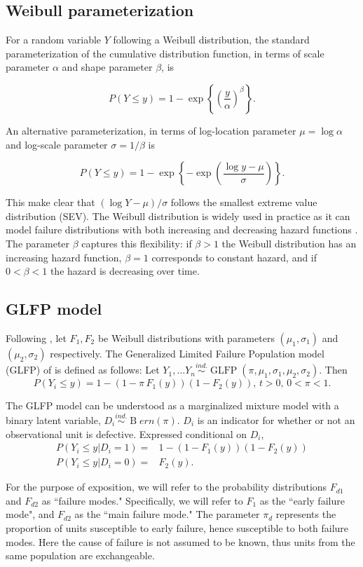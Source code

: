 \documentclass[12pt]{article}
\newcommand{\ind}{\stackrel{ind.}{\sim}}
\newcommand{\op}{\operatorname}
\begin{document}
\subsection{Weibull parameterization}
\label{sec:Weibull parameterization}
For a random variable $Y$ following a Weibull distribution, the standard parameterization of the cumulative distribution function, in terms of scale parameter $\alpha$ and shape parameter $\beta$, is

$$ P(Y \le y) = 1 - \exp \left\{ \left( \frac{y}{\alpha} \right)^\beta \right\}. $$

An alternative parameterization, in terms of log-location parameter $\mu = \log \alpha$ and log-scale parameter $\sigma = 1/\beta$ is

$$ P(Y \le y) = 1 - \exp \left\{ -\exp \left( \frac{ \log y - \mu }{\sigma} \right) \right\}. $$

This make clear that $(\log Y - \mu)/\sigma$ follows the smallest extreme value distribution (SEV). The Weibull distribution is widely used in practice as it can model failure distributions with both increasing and decreasing hazard functions \cite{meeker}. The parameter $\beta$ captures this flexibility: if $\beta>1$ the Weibull distribution has an increasing hazard function, $\beta=1$ corresponds to constant hazard, and if $0<\beta<1$ the hazard is decreasing over time.

\subsection{GLFP model}
\label{subsec:GLFP model}
Following \cite{chan}, let $F_1,F_2$ be Weibull distributions with parameters $(\mu_1,\sigma_1)$ and $(\mu_2, \sigma_2)$ respectively.
The Generalized Limited Failure Population model (GLFP) of \citet{chan} is defined as follows: Let $Y_1,\ldots Y_{n} \ind \op{GLFP}(\pi, \mu_1,\sigma_1,\mu_2,\sigma_2)$. Then
$$P(Y_i \le y) = 1 - (1-\pi\, F_{1}(y))(1 - F_{2}(y)),\, t>0,\, 0 < \pi < 1.$$

The GLFP model can be understood as a marginalized mixture model with a binary latent variable, $D_i\ind \op Bern(\pi)$. $D_i$ is an indicator for whether or not an observational unit is defective. Expressed conditional on $D_i$,
\begin{align*}
P(Y_i\le y | D_i=1) =& 1 -(1-F_1(y))(1-F_2(y))\\
P(Y_i\le y | D_i=0) =& F_2(y).
\end{align*}

For the purpose of exposition, we will refer to the probability distributions $F_{d1}$ and $F_{d2}$ as ``failure modes." Specifically, we will refer to $F_{1}$ as the ``early failure mode", and $F_{d2}$ as the ``main failure mode." The parameter $\pi_d$ represents the proportion of units susceptible to early failure, hence susceptible to both failure modes. Here the cause of failure is not assumed to be known, thus units from the same population are exchangeable.
\end{document}

